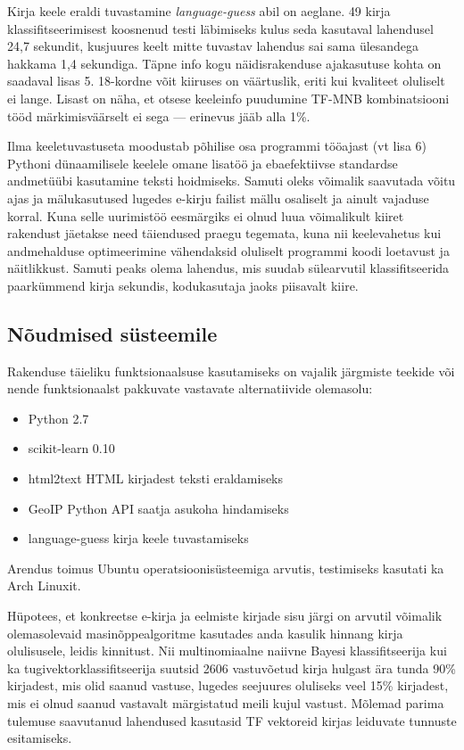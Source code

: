 \documentclass[]{trkuur}
\let\eng\emph
\let\enp\eng
\begin{document}
Kirja keele eraldi tuvastamine \enp{language-guess} abil on aeglane. 49 kirja
klassifitseerimisest koosnenud testi läbimiseks kulus seda kasutaval lahendusel
24,7 sekundit, kusjuures keelt mitte tuvastav lahendus sai sama ülesandega hakkama
1,4 sekundiga. Täpne info kogu näidisrakenduse ajakasutuse kohta on saadaval lisas 5. 
18-kordne võit kiiruses on väärtuslik, eriti kui kvaliteet oluliselt ei lange.
Lisast  on näha, et otsese keeleinfo puudumine TF-MNB kombinatsiooni
tööd märkimisväärselt ei sega --- erinevus jääb alla 1\%.

Ilma keeletuvastuseta moodustab põhilise osa programmi tööajast (vt lisa 6) Pythoni
dünaamilisele keelele omane lisatöö ja ebaefektiivse standardse andmetüübi
kasutamine teksti hoidmiseks. Samuti oleks võimalik saavutada võitu ajas ja mälukasutused
lugedes e-kirju failist mällu osaliselt ja ainult vajaduse korral.
Kuna selle uurimistöö eesmärgiks ei olnud luua võimalikult kiiret rakendust
jäetakse need täiendused praegu tegemata, kuna nii keelevahetus kui andmehalduse
optimeerimine vähendaksid oluliselt programmi koodi loetavust ja näitlikkust.
Samuti peaks olema lahendus, mis suudab sülearvutil klassifitseerida paarkümmend
kirja sekundis, kodukasutaja jaoks piisavalt kiire.

\subsection{Nõudmised süsteemile}
Rakenduse täieliku funktsionaalsuse kasutamiseks on vajalik järgmiste teekide või nende funktsionaalst pakkuvate 
vastavate alternatiivide olemasolu:
\begin{itemize}
    \item Python 2.7
    \item scikit-learn 0.10
    \item html2text HTML kirjadest teksti eraldamiseks
    \item GeoIP Python API saatja asukoha hindamiseks
    \item language-guess kirja keele tuvastamiseks
\end{itemize}
Arendus toimus Ubuntu operatsioonisüsteemiga arvutis, testimiseks kasutati
ka Arch Linuxit.


Hüpotees, et konkreetse e-kirja ja eelmiste kirjade sisu järgi on arvutil võimalik
olemasolevaid masinõppealgoritme kasutades anda kasulik hinnang kirja olulisusele,
leidis kinnitust. Nii multinomiaalne naiivne Bayesi klassifitseerija kui ka
tugivektorklassifitseerija suutsid 2606 vastuvõetud kirja hulgast
ära tunda 90\% kirjadest, mis olid saanud vastuse, lugedes seejuures oluliseks
veel 15\% kirjadest, mis ei olnud saanud vastavalt märgistatud meili kujul vastust.
Mõlemad parima tulemuse saavutanud lahendused kasutasid TF vektoreid kirjas
leiduvate tunnuste esitamiseks.
\end{document}

